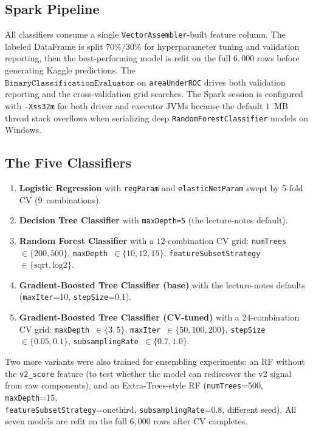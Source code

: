 \documentclass[12pt]{article}
\begin{document}
	\subsection{Spark Pipeline}

	All classifiers consume a single \texttt{VectorAssembler}-built feature column. The labeled DataFrame is split $70\%/30\%$ for hyperparameter tuning and validation reporting, then the best-performing model is refit on the full $6{,}000$ rows before generating Kaggle predictions. The \\  $\texttt{BinaryClassificationEvaluator}$ on \texttt{areaUnderROC} drives both validation reporting and the cross-validation grid searches. The Spark session is configured with \texttt{-Xss32m} for both driver and executor JVMs because the default $1$~MB thread stack overflows when serializing deep \texttt{RandomForestClassifier} models on Windows.

	\subsection{The Five Classifiers}

	\begin{enumerate}
		\item \textbf{Logistic Regression} with \texttt{regParam} and \texttt{elasticNetParam} swept by 5-fold CV ($9$~combinations).
		\item \textbf{Decision Tree Classifier} with \texttt{maxDepth=5} (the lecture-notes default).
		\item \textbf{Random Forest Classifier} with a $12$-combination CV grid: \texttt{numTrees}~$\in\{200, 500\}$, \texttt{maxDepth}~$\in\{10,12,15\}$, \texttt{featureSubsetStrategy}~$\in\{\text{sqrt},\text{log2}\}$.
		\item \textbf{Gradient-Boosted Tree Classifier (base)} with the lecture-notes defaults (\texttt{maxIter}=10, \texttt{stepSize}=0.1).
		\item \textbf{Gradient-Boosted Tree Classifier (CV-tuned)} with a $24$-combination CV grid: \texttt{maxDepth}~$\in\{3,5\}$, \texttt{maxIter}~$\in\{50,100,200\}$, \texttt{stepSize}~$\in\{0.05,0.1\}$, \texttt{subsamplingRate}~$\in\{0.7,1.0\}$.
	\end{enumerate}

	Two more variants were also trained for ensembling experiments: an RF without the \texttt{v2\_score} feature (to test whether the model can rediscover the v2 signal from raw components), and an Extra-Trees-style RF (\texttt{numTrees}=500, \texttt{maxDepth}=15, \\  \texttt{featureSubsetStrategy}=onethird, \texttt{subsamplingRate}=0.8, different seed). All seven models are refit on the full $6{,}000$ rows after CV completes.
\end{document}
